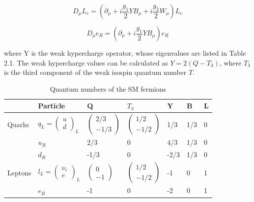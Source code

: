 \begin{equation}
D_{\mu}L_{e} = (\partial_{\mu}+i\frac{g_{1}}{2}YB_{\mu}+i\frac{g_{2}}{2}W_{\mu})L_{e}
\end{equation}

\begin{equation}
D_{\mu}e_{R} = (\partial_{\mu}+i\frac{g_{1}}{2}YB_{\mu})e_{R}
\end{equation}
 
 where Y is the weak hypercharge operator, whose eigenvalues are listed in Table 2.1. The weak hypercharge values can be calculated as $Y=2(Q-T_{3})$, where $T_{3}$ is the third component of the weak isospin quantum number $T$.

 \begin{table}[h!]
	\centering
	\label{qun}
	\begin{tabular}{|l|l|l|l|l|l|l|}
		\hline
		                & Particle & Q   & $T_{3}$ & Y & B & L \\ \hline
		Quarks          & $q_{L} = \begin{pmatrix}
									u \\
									d
									\end{pmatrix}_{L}$ & $\begin{pmatrix} 2/3 \\ -1/3 \end{pmatrix}$  & $\begin{pmatrix} 1/2 \\ -1/2 \end{pmatrix}$ & 1/3 & 1/3 & 0 \\ 
		                & $u_{R}$ & 2/3 & 0 & 4/3 & 1/3 & 0 \\ 
		                & $d_{R}$ & -1/3& 0 & -2/3 & 1/3 & 0 \\ \hline
		Leptons         & $l_{L} = \begin{pmatrix} \nu_{e}\\ e \end{pmatrix}_{L}$ & $\begin{pmatrix} 0 \\ -1 \end{pmatrix}$ & $\begin{pmatrix} 1/2 \\ -1/2 \end{pmatrix}$ & -1 & 0 & 1 \\
		                & $e_{R}$ & -1 & 0 & -2 & 0 & 1 \\ \hline
	
	\end{tabular}
	\caption{Quantum numbers of the SM fermions}
\end{table}

